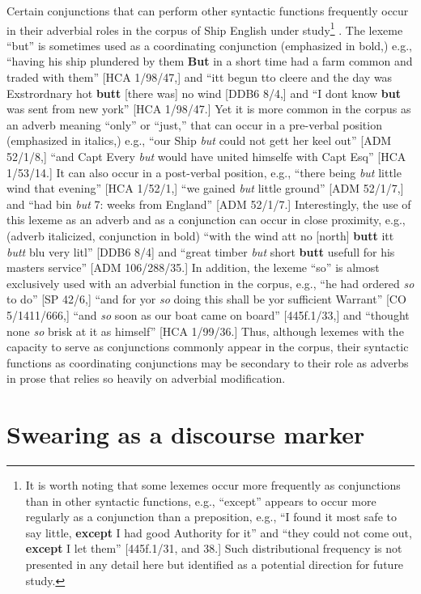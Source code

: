   Certain conjunctions that can perform other syntactic functions frequently occur in their adverbial roles in the corpus of Ship English under study\footnote{It is worth noting that some lexemes occur more frequently as conjunctions than in other syntactic functions, e.g., “except” appears to occur more regularly as a conjunction than a preposition, e.g., “I found it most safe to say little, \textbf{except} I had good Authority for it” and “they could not come out, \textbf{except} I let them” [445f.1/31, and 38.] Such distributional frequency is not presented in any detail here but identified as a potential direction for future study.} . The lexeme “but” is sometimes used as a coordinating conjunction (emphasized in bold,) e.g., “having his ship plundered by them \textbf{But} in a short time had a farm common and traded with them” [HCA 1/98/47,] and “itt begun tto cleere and the day was Exstrordnary hot \textbf{butt} [there was] no wind [DDB6 8/4,] and “I dont know \textbf{but} was sent from new york” [HCA 1/98/47.] Yet it is more common in the corpus as an adverb meaning “only” or “just,” that can occur in a pre-verbal position (emphasized in italics,) e.g., “our Ship \textit{but} could not gett her keel out” [ADM 52/1/8,] “and Capt Every \textit{but} would have united himselfe with Capt Esq” [HCA 1/53/14.] It can also occur in a post-verbal position, e.g., “there being \textit{but} little wind that evening” [HCA 1/52/1,] “we gained \textit{but} little ground” [ADM 52/1/7,] and “had bin \textit{but} 7: weeks from England” [ADM 52/1/7.] Interestingly, the use of this lexeme as an adverb and as a conjunction can occur in close proximity, e.g., (adverb italicized, conjunction in bold) “with the wind att no [north] \textbf{butt} itt \textit{butt} blu very litl” [DDB6 8/4] and “great timber \textit{but} short \textbf{butt} usefull for his masters service” [ADM 106/288/35.] In addition, the lexeme “so” is almost exclusively used with an adverbial function in the corpus, e.g., “he had ordered \textit{so} to do” [SP 42/6,] “and for yor \textit{so} doing this shall be yor sufficient Warrant” [CO 5/1411/666,] “and \textit{so} soon as our boat came on board” [445f.1/33,] and “thought none \textit{so} brisk at it as himself” [HCA 1/99/36.] Thus, although lexemes with the capacity to serve as conjunctions commonly appear in the corpus, their syntactic functions as coordinating conjunctions may be secondary to their role as adverbs in prose that relies so heavily on adverbial modification. 

\section{\textbf{Swearing} \textbf{as} \textbf{a} \textbf{discourse} \textbf{marker} }%

